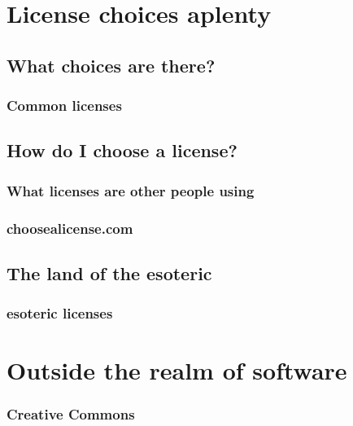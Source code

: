 \documentclass{beamer}
\begin{document}
	\section{License choices aplenty}
	\subsection{What choices are there?}
	\begin{frame}
		\frametitle{Common licenses}
	\end{frame}
	\subsection{How do I choose a license?}
	\begin{frame}
		\frametitle{What licenses are other people using}
	\end{frame}
	\begin{frame}
		\frametitle{choosealicense.com}
	\end{frame}
	\subsection{The land of the esoteric}
	\begin{frame}
		\frametitle{esoteric licenses}
	\end{frame}
	\section{Outside the realm of software}
	\begin{frame}
		\frametitle{Creative Commons}
	\end{frame}
\end{document}
